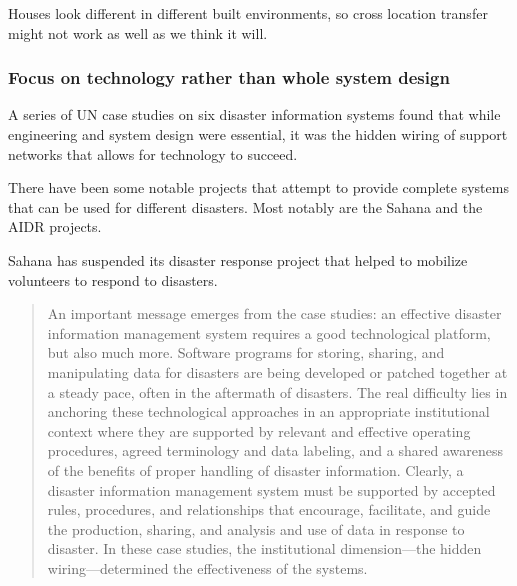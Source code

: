 Houses look different in different built environments, so cross location
transfer might not work as well as we think it will.


\subsubsection{Focus on technology rather than whole system design}
A series of UN case studies on six disaster information systems found that while
engineering and system design were essential, it was the hidden wiring of support
networks that allows for technology to succeed.

There have been some notable projects that attempt to provide complete systems
that can be used for different disasters. Most notably are the Sahana and the
AIDR projects.

Sahana has suspended its disaster response project that helped to
mobilize volunteers to respond to disasters.
\cite{SahanaAGM2018}

  
\begin{quote}
An important message emerges from the case studies: an effective disaster
information management system requires a good technological platform,
but also much more. Software programs for storing, sharing, and manipulating
data for disasters are being developed or patched together at a steady pace,
often in the aftermath of disasters. The real difficulty lies in anchoring
these technological approaches in an appropriate institutional context where
they are supported by relevant and effective operating procedures, agreed
terminology and data labeling, and a shared awareness of the benefits of proper
handling of disaster information. Clearly, a disaster information management
system must be supported by accepted rules, procedures, and relationships
that encourage, facilitate, and guide the production, sharing, and analysis and
use of data in response to disaster. In these case studies, the institutional
dimension---the hidden wiring---determined the effectiveness of the
systems.~\cite{aminDataNaturalDisasters2008}
\end{quote}

